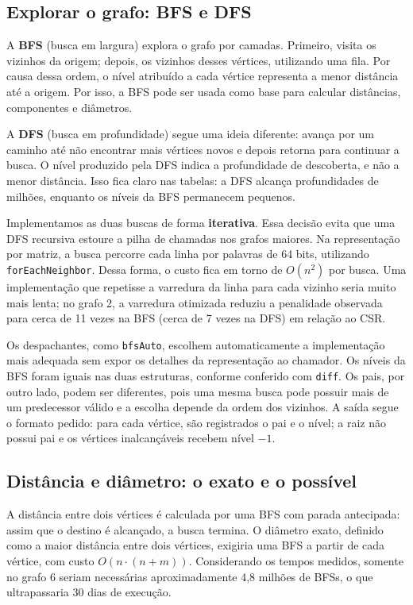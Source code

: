 \documentclass[11pt,a4paper]{article}
\begin{document}
\subsection{Explorar o grafo: BFS e DFS}

A \textbf{BFS} (busca em largura) explora o grafo por camadas. Primeiro, visita os
vizinhos da origem; depois, os vizinhos desses v\'ertices, utilizando uma fila. Por
causa dessa ordem, o n\'ivel atribu\'ido a cada v\'ertice representa a menor dist\^ancia
at\'e a origem. Por isso, a BFS pode ser usada como base para calcular dist\^ancias,
componentes e di\^ametros.

A \textbf{DFS} (busca em profundidade) segue uma ideia diferente: avan\c ca por um
caminho at\'e n\~ao encontrar mais v\'ertices novos e depois retorna para continuar a
busca. O n\'ivel produzido pela DFS indica a profundidade de descoberta, e n\~ao a
menor dist\^ancia. Isso fica claro nas tabelas: a DFS alcan\c ca profundidades de
milh\~oes, enquanto os n\'iveis da BFS permanecem pequenos.

Implementamos as duas buscas de forma \textbf{iterativa}. Essa decis\~ao evita que uma
DFS recursiva estoure a pilha de chamadas nos grafos maiores. Na representa\c c\~ao por
matriz, a busca percorre cada linha por palavras de 64 bits, utilizando
\texttt{forEachNeighbor}. Dessa forma, o custo fica em torno de $O(n^2)$ por busca.
Uma implementa\c c\~ao que repetisse a varredura da linha para cada vizinho seria muito
mais lenta; no grafo 2, a varredura otimizada reduziu a penalidade observada para cerca
de 11 vezes na BFS (cerca de 7 vezes na DFS) em rela\c c\~ao ao CSR.

Os despachantes, como \texttt{bfsAuto}, escolhem automaticamente a implementa\c c\~ao
mais adequada sem expor os detalhes da representa\c c\~ao ao chamador. Os n\'iveis da
BFS foram iguais nas duas estruturas, conforme conferido com \texttt{diff}. Os pais,
por outro lado, podem ser diferentes, pois uma mesma busca pode possuir mais de um
predecessor v\'alido e a escolha depende da ordem dos vizinhos. A sa\'ida segue o
formato pedido: para cada v\'ertice, s\~ao registrados o pai e o n\'ivel; a raiz n\~ao
possui pai e os v\'ertices inalcan\c c\'aveis recebem n\'ivel $-1$.

\subsection{Dist\^ancia e di\^ametro: o exato e o poss\'ivel}

A dist\^ancia entre dois v\'ertices \'e calculada por uma BFS com parada antecipada:
assim que o destino \'e alcan\c cado, a busca termina. O di\^ametro exato, definido como
a maior dist\^ancia entre dois v\'ertices, exigiria uma BFS a partir de cada v\'ertice,
com custo $O(n\cdot(n+m))$. Considerando os tempos medidos, somente no grafo 6 seriam
necess\'arias aproximadamente 4,8 milh\~oes de BFSs, o que ultrapassaria 30 dias de
execu\c c\~ao.
\end{document}
